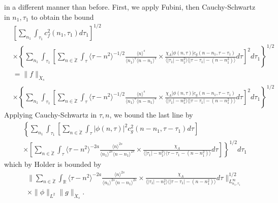 \documentclass[12pt,reqno]{amsart}
\numberwithin{equation}{section}  %
\newcommand{\rr}{\mathbb{R}}
\newcommand{\zz}{\mathbb{Z}}
\newcommand{\zzdot}{\dot{\zz}}
\begin{document}
in a different manner than before. First, we apply 
Fubini, then Cauchy-Schwartz in $n_{1}, \tau_{1}$ to obtain the bound
\begin{equation*}
\begin{split}
& \left[ \sum_{n_{1}} \int_{\tau_{1}} c_{f}^{2}(n_{1}, \tau_{1}) d \tau_{1}
\right]^{1/2}
\\
& \times \left \{\sum_{n_{1}} \int_{\tau_{1}}   
\left[
\sum_{n \in \zzdot} \int_{\tau} \langle \tau - n^{2} \rangle ^{-1/2}
\frac{\langle n \rangle ^{s}}{\langle n_{1} \rangle ^{s} \langle
n - n_{1}\rangle ^{s}} \times \frac{\chi_{A} |\phi(n, \tau)| c_{g}(n -
n_{1}, \tau - \tau_{1})
}{\langle | \tau_{1} | - n_{1}^{2} \rangle \langle | \tau -
\tau_{1} | - (n - n_{1}^{2}) \rangle} d \tau 
\right]^{2} d \tau_{1} \right \}^{1/2}
\\
& = \| f \|_{\dot{X}_{s}}
\\
& \times \left \{\sum_{n_{1}} \int_{\tau_{1}}   
\left[
\sum_{n \in \zzdot} \int_{\tau} \langle \tau - n^{2} \rangle ^{-1/2}
\frac{\langle n \rangle ^{s}}{\langle n_{1} \rangle ^{s} \langle
n - n_{1}\rangle ^{s}} \times \frac{\chi_{A}|\phi(n, \tau)| c_{g}(n -
n_{1}, \tau - \tau_{1}) 
}{\langle | \tau_{1} | - n_{1}^{2} \rangle \langle | \tau -
\tau_{1} | - (n - n_{1}^{2}) \rangle} d \tau 
\right]^{2} d \tau_{1}  \right \}^{1/2}
\end{split}
\end{equation*}
Applying Cauchy-Schwartz in $\tau, n$, we bound the last line by 
\begin{equation*}
\begin{split}
& \left \{\sum_{n_{1}} \int_{\tau_{1}}   
\left [ \sum_{n \in \zzdot} \int_{\tau}
| \phi(n, \tau)|^{2} c_{g}^{2}(n - n_{1}, \tau - \tau_{1}) d \tau  
\right ] \right . 
\\
& \left. \times \left [ \sum_{n \in \zzdot} \int_{\tau} 
\langle \tau - n^{2} \rangle ^{-2a}
\frac{\langle n \rangle
^{2s}}{\langle n_{1} \rangle ^{2s} \langle n - n_{1}\rangle ^{2s}}
\times \frac{\chi_{A}}{\langle | \tau_{1} |
- n_{1}^{2} \rangle  \langle \tau - \tau_{1} - (n - n_{1}^{2})
\rangle} d \tau  \right ] \right \}^{1/2}d \tau_{1} 
\end{split}
\end{equation*}
which by Holder is bounded by 
\begin{equation}
\label{integral-bound-2nd-form-per}
\begin{split}
& \| \sum_{n \in \zzdot} \int_{\rr} 
\langle \tau - n^{2} \rangle ^{-2a}
\frac{\langle n \rangle ^{2s}}{\langle n_{1} \rangle ^{2s} \langle
n - n_{1}\rangle ^{2s}}  \times \frac{\chi_{A}}{\langle | \tau_{1} | - n_{1}^{2} \rangle  \langle | \tau -
\tau_{1} | - (n - n_{1}^{2}) \rangle} d \tau 
\|_{L^{\infty}_{n_{1}, \tau_{1}}}^{1/2}
\\
& \times \|\phi\|_{L^{2}} \| g \|_{\dot{X}_{s}}.
\end{split}
\end{equation}
\end{document}
